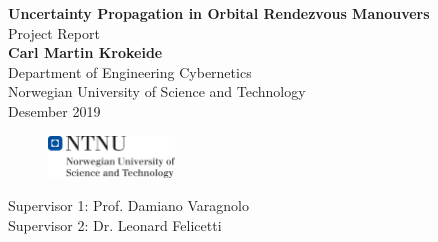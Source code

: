 \documentclass[a4paper]{article}
\begin{document}
\begin{titlepage}
\begin{center}
\Large \textbf{Uncertainty Propagation in Orbital Rendezvous Manouvers} \\
\vspace{0.25cm}
\large Project Report \\
\vspace{1cm}
\large \textbf{Carl Martin Krokeide} \\
\vspace{0.1cm}
 Department of Engineering Cybernetics \\
\vspace{0.1cm}
 Norwegian University of Science and Technology \\
\vspace{0.75cm}
\large Desember 2019 \\
\vspace{1.5cm}
\end{center}
\end{titlepage}





\begin{figure}
    \centering
    \includegraphics[width=0.3\textwidth]{hovedlogo_eng.png}
\end{figure}

\vspace{\fill}
\large{Supervisor 1: Prof. Damiano Varagnolo \\
Supervisor 2: Dr. Leonard Felicetti} 

\begin{figure}
\end{figure}


\newpage

\tableofcontents 

\newpage



\newpage



\newpage



\newpage

\printbibliography[heading=bibintoc,title={References}]
\end{document}
